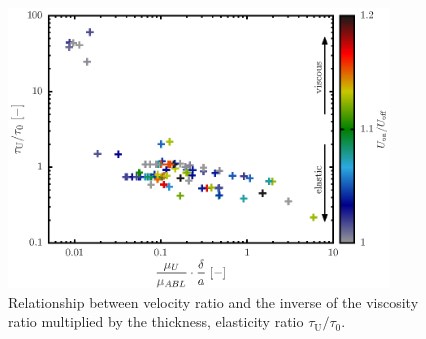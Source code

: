 \begin{figure}[H]
    \centering
    \includegraphics[width=0.9\textwidth]{5-Results/elastcity_color.eps}
    \caption{Relationship between velocity ratio and the inverse of the viscosity ratio multiplied by the thickness, elasticity ratio $\tau_\text{U}/\tau_\text{0}$.}
    \label{fig:elastcityColor}
\end{figure}
